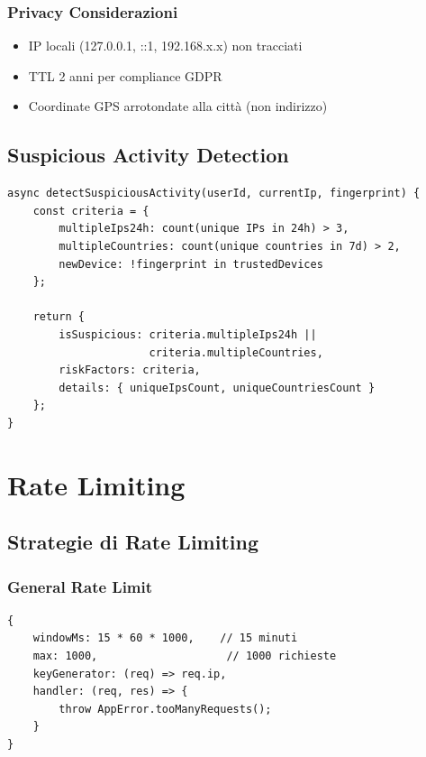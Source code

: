 \documentclass[12pt,a4paper]{report}
\begin{document}
\subsection{Privacy Considerazioni}

\begin{itemize}
    \item IP locali (127.0.0.1, ::1, 192.168.x.x) non tracciati
    \item TTL 2 anni per compliance GDPR
    \item Coordinate GPS arrotondate alla città (non indirizzo)
\end{itemize}

\section{Suspicious Activity Detection}

\begin{lstlisting}[caption={Detection Algorithm}]
async detectSuspiciousActivity(userId, currentIp, fingerprint) {
    const criteria = {
        multipleIps24h: count(unique IPs in 24h) > 3,
        multipleCountries: count(unique countries in 7d) > 2,
        newDevice: !fingerprint in trustedDevices
    };
    
    return {
        isSuspicious: criteria.multipleIps24h || 
                      criteria.multipleCountries,
        riskFactors: criteria,
        details: { uniqueIpsCount, uniqueCountriesCount }
    };
}
\end{lstlisting}

\chapter{Rate Limiting}

\section{Strategie di Rate Limiting}

\subsection{General Rate Limit}

\begin{lstlisting}[caption={General Limiter Configuration}]
{
    windowMs: 15 * 60 * 1000,    // 15 minuti
    max: 1000,                    // 1000 richieste
    keyGenerator: (req) => req.ip,
    handler: (req, res) => {
        throw AppError.tooManyRequests();
    }
}
\end{lstlisting}
\end{document}
